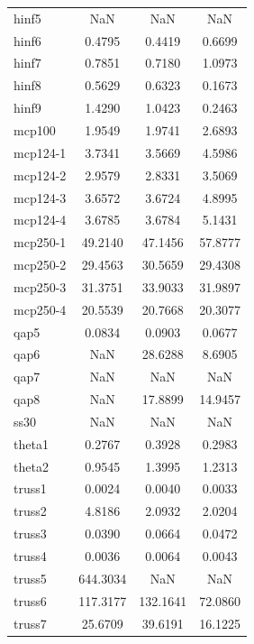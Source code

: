 \begin{longtable}{lccc}
hinf5    &      NaN &      NaN &      NaN \\
hinf6    &   0.4795 &   0.4419 &   0.6699 \\
hinf7    &   0.7851 &   0.7180 &   1.0973 \\
hinf8    &   0.5629 &   0.6323 &   0.1673 \\
hinf9    &   1.4290 &   1.0423 &   0.2463 \\
mcp100   &   1.9549 &   1.9741 &   2.6893 \\
mcp124-1 &   3.7341 &   3.5669 &   4.5986 \\
mcp124-2 &   2.9579 &   2.8331 &   3.5069 \\
mcp124-3 &   3.6572 &   3.6724 &   4.8995 \\
mcp124-4 &   3.6785 &   3.6784 &   5.1431 \\
mcp250-1 &  49.2140 &  47.1456 &  57.8777 \\
mcp250-2 &  29.4563 &  30.5659 &  29.4308 \\
mcp250-3 &  31.3751 &  33.9033 &  31.9897 \\
mcp250-4 &  20.5539 &  20.7668 &  20.3077 \\
qap5     &   0.0834 &   0.0903 &   0.0677 \\
qap6     &      NaN &  28.6288 &   8.6905 \\
qap7     &      NaN &      NaN &      NaN \\
qap8     &      NaN &  17.8899 &  14.9457 \\
ss30     &      NaN &      NaN &      NaN \\
theta1   &   0.2767 &   0.3928 &   0.2983 \\
theta2   &   0.9545 &   1.3995 &   1.2313 \\
truss1   &   0.0024 &   0.0040 &   0.0033 \\
truss2   &   4.8186 &   2.0932 &   2.0204 \\
truss3   &   0.0390 &   0.0664 &   0.0472 \\
truss4   &   0.0036 &   0.0064 &   0.0043 \\
truss5   & 644.3034 &      NaN &      NaN \\
truss6   & 117.3177 & 132.1641 &  72.0860 \\
truss7   &  25.6709 &  39.6191 &  16.1225 \\
\end{longtable}

